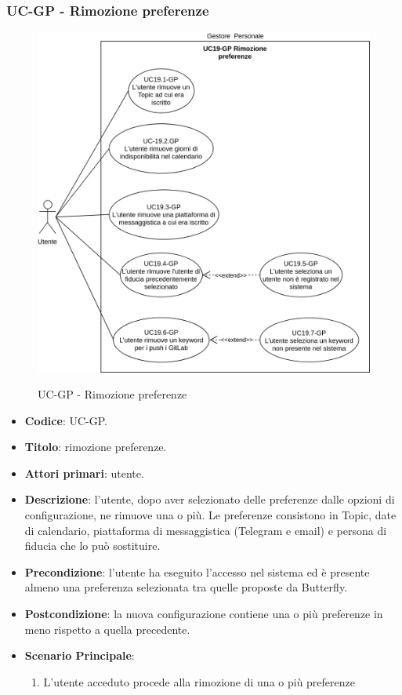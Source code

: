 \subsubsection{UC\theuccount-GP - Rimozione preferenze}
		\begin{figure}[H]
			\centering
				\includegraphics[width=\textwidth]{img/casi_d'uso/UC19.png}\\
			\caption{UC\theuccount-GP - Rimozione preferenze}
		\end{figure}
	\begin{itemize}
		\item \textbf{Codice}: UC\theuccount-GP.
		\item \textbf{Titolo}: rimozione preferenze.
		\item \textbf{Attori primari}: utente.
		\item \textbf{Descrizione}: l’utente, dopo aver selezionato delle preferenze dalle opzioni di configurazione, ne rimuove una o più. Le preferenze consistono in Topic, date di calendario, piattaforma di messaggistica (Telegram e email) e persona di fiducia che lo può sostituire.
		\item \textbf{Precondizione}: l’utente ha eseguito l'accesso nel sistema ed è presente almeno	una preferenza selezionata tra quelle proposte da Butterfly.
		\item \textbf{Postcondizione}: la nuova configurazione contiene una o più preferenze in meno rispetto	a quella precedente.
		\item \textbf{Scenario Principale}:
		\begin{enumerate}
			\item L'utente acceduto procede alla rimozione di una o più preferenze
		\end{enumerate}
	\end{itemize}

